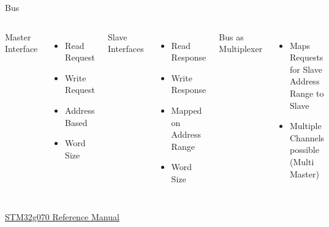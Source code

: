 \documentclass[10pt]{beamer}
\begin{document}
\begin{frame}[fragile]{Bus}
  \begin{columns}[T,onlytextwidth]
    Master Interface
    \begin{itemize}
      \item Read Request
      \item Write Request
      \item Address Based
      \item Word Size
    \end{itemize}
    Slave Interfaces
    \begin{itemize}
      \item Read Response 
      \item Write Response
      \item Mapped on Address Range
      \item Word Size
    \end{itemize}
    Bus as Multiplexer
    \begin{itemize}
      \item Maps Requests for Slave Address Range to Slave
      \item Multiple Channels possible (Multi Master)
    \end{itemize}
  \end{columns}
\begin{center}
  \vspace{2cm}
  \href{https://www.google.com/url?sa=t&source=web&rct=j&opi=89978449&url=https://www.st.com/resource/en/reference_manual/rm0454-stm32g0x0-advanced-armbased-32bit-mcus-stmicroelectronics.pdf&ved=2ahUKEwi60-Sj-JyRAxUc_7sIHQfdIJwQFnoECAwQAQ&usg=AOvVaw3lSwbTb5IyN9LnayPYfHpf}{STM32g070 Reference Manual}
\end{center}
\end{frame}
\end{document}
